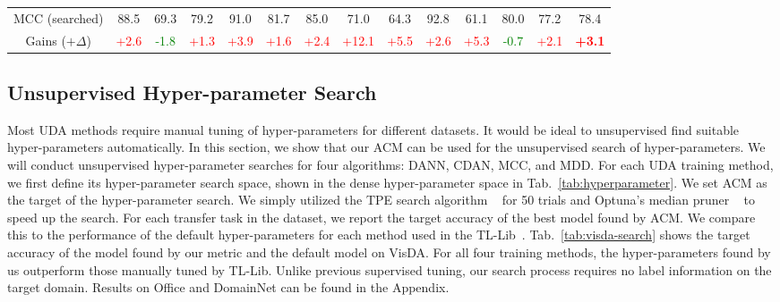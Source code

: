\documentclass{article} %
\begin{document}
\begin{table*}[t]
{\begin{tabular}{cccccccccccccc}
			MCC (searched) & 88.5 & 69.3 & 79.2 & 91.0 & 81.7 & 85.0 & 71.0 & 64.3 & 92.8 & 61.1 & 80.0 & 77.2 & 78.4 \\
                Gains ($+\Delta$) & \textcolor{red}{+2.6} & \textcolor{green}{-1.8} & \textcolor{red}{+1.3} & \textcolor{red}{+3.9} & \textcolor{red}{+1.6} & \textcolor{red}{+2.4} & \textcolor{red}{+12.1} & \textcolor{red}{+5.5} & \textcolor{red}{+2.6} & \textcolor{red}{+5.3} & \textcolor{green}{-0.7} & \textcolor{red}{+2.1} & \textcolor{red}{\textbf{+3.1}} \\
			\bottomrule
	\end{tabular}}
        \caption{Hyper-parameters found by our metric vs. those manually tuned on VisDA2017. }
	\label{tab:visda-search}
\vspace{-4mm}
\end{table*}

\subsection{Unsupervised Hyper-parameter Search}

Most UDA methods require manual tuning of hyper-parameters for different datasets. It would be ideal to unsupervised find suitable hyper-parameters automatically. In this section, we show that our ACM can be used for the unsupervised search of hyper-parameters. We will conduct unsupervised hyper-parameter searches for four algorithms: DANN, CDAN, MCC, and MDD. For each UDA training method, we first define its hyper-parameter search space, shown in the dense hyper-parameter space in Tab.~\ref{tab:hyperparameter}. 
We set ACM as the target of the hyper-parameter search. We simply utilized the TPE search algorithm ~\cite{TPE} for 50 trials and Optuna's median pruner ~\cite{Optuna} to speed up the search. For each transfer task in the dataset, we report the target accuracy of the best model found by ACM. We compare this to the performance of the default hyper-parameters for each method used in the TL-Lib~\cite{tllib}.
Tab.~\ref{tab:visda-search} shows the target accuracy of the model found by our metric and the default model on VisDA. For all four training methods, the hyper-parameters found by us outperform those manually tuned by TL-Lib. Unlike previous supervised tuning, our search process requires no label information on the target domain. Results on Office and DomainNet can be found in the Appendix.
\end{document}
